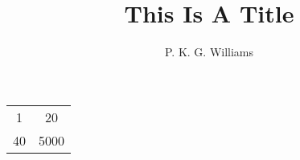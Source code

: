 \documentclass{article}
\title{This Is A Title}
\author{P. K. G. Williams}
\begin{document}
\begin{tabular}{cc}
1 & 20 \\
40 & 5000
\end{tabular}
\end{document}
